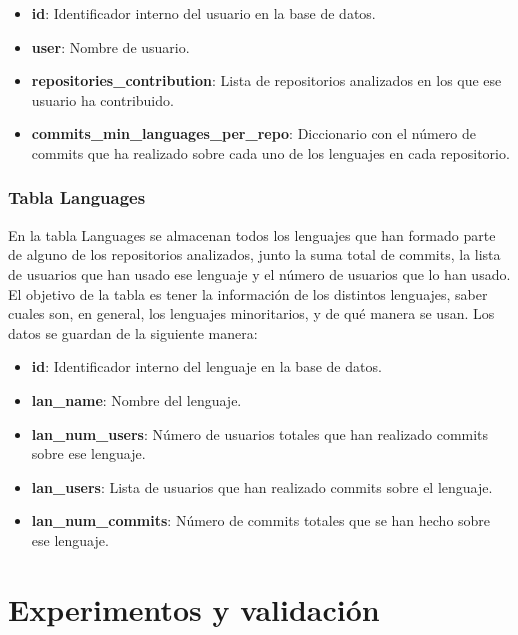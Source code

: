 \documentclass[a4paper, 12pt]{book}
\begin{document}
\begin{itemize}
  \item \textbf{id}: Identificador interno del usuario en la base de datos.
  \item \textbf{user}: Nombre de usuario.
  \item \textbf{repositories\_contribution}: Lista de repositorios analizados en los que ese usuario ha contribuido.
  \item \textbf{commits\_min\_languages\_per\_repo}: Diccionario con el número de commits que ha realizado sobre cada uno de los lenguajes en cada repositorio.
\end{itemize}

\subsection{Tabla Languages}
\label{subsec:Tabla Languages}

En la tabla Languages se almacenan todos los lenguajes que han formado parte de alguno de los repositorios analizados, junto la suma total de commits, la lista de usuarios que han usado ese lenguaje y el número de usuarios que lo han usado. El objetivo de la tabla es tener la información de los distintos lenguajes, saber cuales son, en general, los lenguajes minoritarios, y de qué manera se usan. Los datos se guardan de la siguiente manera:

\begin{itemize}
  \item \textbf{id}: Identificador interno del lenguaje en la base de datos.
  \item \textbf{lan\_name}: Nombre del lenguaje.
  \item \textbf{lan\_num\_users}: Número de usuarios totales que han realizado commits sobre ese lenguaje.
  \item \textbf{lan\_users}: Lista de usuarios que han realizado commits sobre el lenguaje.
  \item \textbf{lan\_num\_commits}: Número de commits totales que se han hecho sobre ese lenguaje.
\end{itemize}



\cleardoublepage
\chapter{Experimentos y validación}
\label{chap:experimentos}
\end{document}
